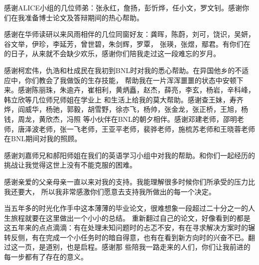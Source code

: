 感谢ALICE小组的几位师弟：张永红，詹扬，彭忻烨，任小文，罗文钊。感谢你们在我准备博士论文及答辩期间的热心帮助。

感谢在华师读研以来风雨相伴的几位同窗好友：龚晖，陈蔚，刘可，饶识，吴妍，谷文举，伊珍，李延芳，曾世碧，朱剑辉，罗覃，
张瑛，张煜，鄢君。有你们在的日子，从来就不会缺少欢乐，感谢你们陪我走过这一段难忘的岁月。

感谢柯宏伟，仇浩和杜成民在我初到BNL时对我的悉心帮助。在异国他乡的不适应中，你们教会了我做饭的生存技能，
帮助我在一片浑浑噩噩的状态中安顿下来。感谢陈丽珠，朱逾卉，崔相利，黄炳矗，赵杰，薛亮，李玄，杨岩，辛科峰，韩立欣等几位师兄师姐在学业上
和生活上给我的莫大帮助。感谢查王妹，寿齐烨，阎威华，杨驰，郭毅，胡雪野，徐亦飞，杨帅，张金龙，张正桥，王旭，杨钱，周龙，黄欣杰，冯照
等小伙伴在BNL的朝夕相伴。感谢邓建老师，邵明老师，唐泽波老师，张一飞老师，王亚平老师，裴骅老师，施梳苏老师和王晓蓉老师在BNL期间对我的照顾。

感谢刘嘉师兄和郝阳师姐在我们的英语学习小组中对我的帮助。和你们一起经历的挑战让我觉得这世上没有不能克服的困难。


感谢亲爱的父亲母亲一直以来对我的支持。我能理解很多时候你们所承受的压力比我还要大，
所以我非常感激你们愿意去支持我所做出的每一个决定。


当五年多的时光化作手中这本薄薄的毕业论文，很难想象一段超过二十分之一的人生旅程就要在这里做出一个小小的总结。
重新翻过自己的论文，好像看到的都是这五年来的点点滴滴：有在处理未知问题时的忐忑不安，有在寻求解决方案时的辗
转反侧，有在完成一个小任务时的暗自得意，也有在看到新方向时的兴奋不已。翻过这一页，是道别，也是启程。感谢那
些陪我一路走来的人们，你们让我前进的每一步都有了存在的意义。